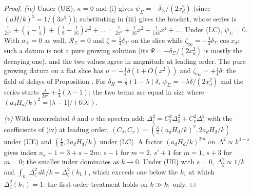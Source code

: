 \begin{proof}
\emph{(iv)} Under (UE), $\kappa = 0$ and (i) gives $\psi_{\Sigma} = -\delta_{\Sigma}/(2x_{d}^{2})$ (since $(aH/k)^{2} = 1/(3x^{2})$); substituting in (iii) gives the bracket, whose series is $\tfrac{1}{2x^{2}} + (\tfrac14 - \tfrac14) + (\tfrac18 - \tfrac1{16})x^{2} + \dots = \tfrac{1}{2x^{2}} + \tfrac{1}{16}x^{2} - \tfrac{1}{144}x^{4} + \dots$. Under (LC), $\psi_{\Sigma} = 0$. With $u_{\Sigma} = 0$ as well, $\mathcal{R}_{\Sigma} = 0$ and $\zeta = \tfrac14\delta_{\Sigma}$ on the slice while $\zeta_{\infty} = -\tfrac14\delta_{\Sigma}\cos x_{d}$: such a datum is not a pure growing solution (its $\Psi = -\delta_{\Sigma}/(2x_{d}^{2})$ is mostly the decaying one), and the two values agree in magnitude at leading order. The pure growing datum on a flat slice has $u = -\tfrac14\delta(1 + O(x^{2}))$ and $\zeta_{\infty} = +\tfrac14\delta$: the field of delays of Proposition . For $\delta_{H} = \tfrac12(1 - \lambda)\delta$, $\psi_{\Sigma} = -\lambda\delta/(2x_{d}^{2})$ and the series starts $\tfrac{\lambda}{2x^{2}} + \tfrac14(\lambda - 1)$; the two terms are equal in size where $(a_{d}H_{d}/k)^{2} = |\lambda - 1|/(6|\lambda|)$.

\emph{(v)} With uncorrelated $\delta$ and $v$ the spectra add: $\Delta^{2}_{\zeta} = C_{\delta}^{2}\Delta^{2}_{\delta} + C_{v}^{2}\Delta^{2}_{v}$ with the coefficients of (iv) at leading order, $(C_{\delta}, C_{v}) = (\tfrac32(a_{d}H_{d}/k)^{2}, 2a_{d}H_{d}/k)$ under (UE) and $(\tfrac14, 2a_{d}H_{d}/k)$ under (LC). A factor $(a_{d}H_{d}/k)^{2m}$ on $\Delta^{2} \propto k^{3 + s}$ gives index $n_{s} - 1 = 3 + s - 2m$: $s - 1$ for $m = 2$, $s' + 1$ for $m = 1$, $s + 3$ for $m = 0$; the smaller index dominates as $k \to 0$. Under (UE) with $s = 0$, $\Delta^{2}_{\zeta} \propto 1/k$ and $\int_{k_{1}}\Delta^{2}_{\zeta}\,dk/k = \Delta^{2}_{\zeta}(k_{1})$, which exceeds one below the $k_{1}$ at which $\Delta^{2}_{\zeta}(k_{1}) = 1$: the first-order treatment holds on $k \gg k_{1}$ only.


\end{proof}
